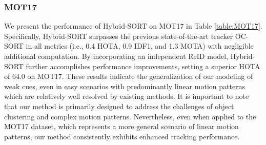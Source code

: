 \documentclass[letterpaper]{article} \usepackage{aaai23}  \usepackage{times}  \usepackage{helvet}  \usepackage{courier}  \usepackage[hyphens]{url}  \usepackage{graphicx} \urlstyle{rm} \def\UrlFont{\rm}  \usepackage{natbib}  \usepackage{caption} \frenchspacing  \setlength{\pdfpagewidth}{8.5in}  \setlength{\pdfpageheight}{11in}  \usepackage{algorithm}
\begin{document}
\subsubsection{MOT17}
We present the performance of Hybrid-SORT on MOT17 in Table \ref{table:MOT17}. Specifically, Hybrid-SORT surpasses the previous state-of-the-art tracker OC-SORT in all metrics (i.e., 0.4 HOTA, 0.9 IDF1, and 1.3 MOTA) with negligible additional computation. By incorporating an independent ReID model, Hybrid-SORT further accomplishes performance improvements, setting a superior HOTA of 64.0 on MOT17. These results indicate the generalization of our modeling of weak cues, even in easy scenarios with predominantly linear motion patterns which are relatively well resolved by existing methods. It is important to note that our method is primarily designed to address the challenges of object clustering and complex motion patterns. Nevertheless, even when applied to the MOT17 dataset, which represents a more general scenario of linear motion patterns, our method consistently exhibits enhanced tracking performance. 
\end{document}
